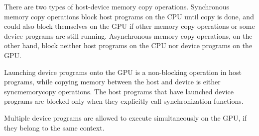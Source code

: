 There are two types of host-device memory copy operations.
Synchronous memory copy operations block host programs on the CPU until
copy is done, and could also block themselves on the GPU if other memory
copy operations or some device programs are still running.
Asynchronous memory copy operations, on the other hand, block neither
host programs on the CPU nor device programs on the GPU.

Launching device programs onto the GPU is a non-blocking operation in
host programs, while copying memory between the host and device is
either syncmemorycopy operations.
The host programs that have launched device programs are blocked only
when they explicitly call synchronization functions.

Multiple device programs are allowed to execute simultaneously on the
GPU, if they belong to the same context.

